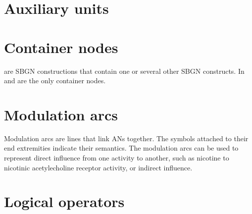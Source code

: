 




\section{Auxiliary units}\label{sec:af:AUs}




\section{Container nodes}
\label{sec:af:CNs}

 are SBGN constructions that contain one or several other SBGN constructs.  In \SBGNAFLone {} and  are the only container nodes.






\section{Modulation arcs}\label{sec:af:arcs}

Modulation arcs are lines that link ANs together.  The symbols attached to their end extremities indicate their semantics.  The modulation arcs can be used to represent direct influence from one activity to another, such as nicotine to nicotinic acetylecholine receptor activity, or indirect influence.











\section{Logical operators}\label{sec:af:logic}




 